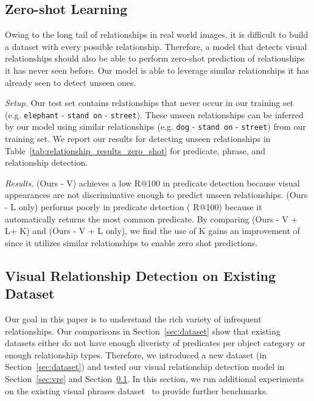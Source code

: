 \documentclass[runningheads]{llncs}
\newcommand{\relationship}[3]{\texttt{#1} - \texttt{#2} - \texttt{#3}}
\newcommand{\eg}[1]{e.g. #1}
\begin{document}
\subsection{Zero-shot Learning}
\label{sec:zsl}
Owing to the long tail of relationships in real world images, it is difficult to build a dataset with every possible relationship. Therefore, a model that detects visual relationships should also be able to perform zero-shot prediction of relationships it has never seen before. Our model is able to leverage similar relationships it has already seen to detect unseen ones.


\label{sec:zero_shot}
\textit{Setup.} Our test set contains  relationships that never occur in our training set (\eg \relationship{elephant}{stand on}{street}). These unseen relationships can be inferred by our model using similar relationships (\eg \relationship{dog}{stand on}{street}) from our training set. We report our results for detecting unseen relationships in Table~\ref{tab:relationship_results_zero_shot} for predicate, phrase, and relationship detection. 

\textit{Results.} (Ours - V) achieves a low  R@100 in predicate detection because visual appearances are not discriminative enough to predict unseen relationships. (Ours - L only)  performs poorly in predicate detection ( R@100) because it automatically returns the most common predicate. 
By comparing (Ours - V + L+ K) and (Ours - V + L only), we find the use of K gains an improvement of  since it utilizes similar relationships to enable zero shot predictions.

\subsection{Visual Relationship Detection on Existing Dataset}
\label{sec:vpe}
Our goal in this paper is to understand the rich variety of infrequent relationships. Our comparisons in Section~\ref{sec:dataset} show that existing datasets either do not have enough diveristy of predicates per object category or enough relationship types. Therefore, we introduced a new dataset (in Section~\ref{sec:dataset}) and tested our visual relationship detection model in Section~\ref{sec:vre} and Section~\ref{sec:zsl}. In this section, we run additional experiments on the existing visual phrases dataset~\cite{sadeghi2011recognition} to provide further benchmarks. 
\end{document}
